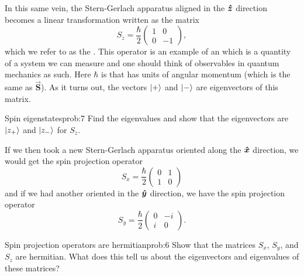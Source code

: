 \documentclass{article}
\newcommand{\vecS}{\boldsymbol{\vec{S}}}
\begin{document}
In this same vein, the Stern-Gerlach apparatus aligned in the $\boldsymbol{\hat{z}}$ direction becomes a linear transformation written as the matrix
\[
S_z = \frac{\hbar}{2} \begin{pmatrix} 1 & 0 \\ 0 & -1 \end{pmatrix},
\]
which we refer to as the .  This operator is an example of an  which is a quantity of a system we can measure and one should think of observables in quantum mechanics as such. Here $\hbar$ is  that has units of angular momentum (which is the same as $\vecS$). As it turns out, the vectors $\ket{+}$ and $\ket{-}$ are eigenvectors of this matrix.

\begin{problem}{Spin eigenstates}{prob:7}
    Find the eigenvalues and show that the eigenvectors are $\ket{z_+}$ and $\ket{z_-}$ for $S_z$. 
\end{problem}

If we then took a new Stern-Gerlach apparatus oriented along the $\boldsymbol{\hat{x}}$ direction, we would get the spin projection operator
\[
S_x = \frac{\hbar}{2} \begin{pmatrix} 0 & 1 \\ 1 & 0 \end{pmatrix}
\]
and if we had another oriented in the $\boldsymbol{\hat{y}}$ direction, we have the spin projection operator
\[
S_y = \frac{\hbar}{2} \begin{pmatrix} 0 & -i \\ i & 0 \end{pmatrix}.
\]

\begin{problem}{Spin projection operators are hermitian}{prob:6}
    Show that the matrices $S_x$, $S_y$, and $S_z$ are hermitian. What does this tell us about the eigenvectors and eigenvalues of these matrices?
\end{problem}
\end{document}
